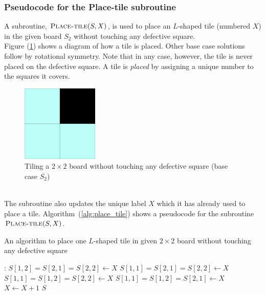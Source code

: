 \documentclass[12pt]{report}
\begin{document}
    \subsubsection*{Pseudocode for the Place-tile subroutine}
    A subroutine, $\Call{Place-tile}{S, X}$, is used to place an $L$-shaped tile (numbered $X$) in the given board $S_{2}$ without touching any defective square.
    \vspace{20pt} \\
    Figure (\ref{fig:place_tile}) shows a diagram of how a tile is placed.
    Other base case solutions follow by rotational symmetry.
    Note that in any case, however, the tile is never placed on the defective square.
    A tile is \textit{placed} by assigning a unique number to the squares it covers.
    \vspace*{10pt}
    \begin{figure}[htp]
        \begin{center}
            \includegraphics[width=0.325\textwidth]{place_tile.png}
        \end{center}
        \caption{Tiling a $2 \times 2$ board without touching any defective square (base case $S_{2}$)}
        \label{fig:place_tile}
    \end{figure}
    \vspace*{10pt} \\
    The subroutine also updates the unique label $X$ which it has already used to place a tile.
    Algorithm~(\ref{alg:place_tile}) shows a pseudocode for the subroutine $\Call{Place-tile}{S, X}$.
    \begin{algorithm}
        \caption{An algorithm to place one $L$-shaped tile in given $2 \times 2$ board without touching any defective square}
        \label{alg:place_tile}
        \begin{algorithmic}[1]
            :
                    \State $S[1, 2] = S[2, 1] = S[2, 2] \gets X$
                    \State $S[1, 1] = S[2, 1] = S[2, 2] \gets X$
                    \State $S[1, 1] = S[1, 2] = S[2, 2] \gets X$
                \Else
                    \State $S[1, 1] = S[1, 2] = S[2, 1] \gets X$
                \EndIf
                \State $X \gets X + 1$
                \State \Return $S$
            \EndProcedure
        \end{algorithmic}
    \end{algorithm}
\end{document}
